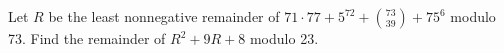 Let $R$ be the least nonnegative remainder of $71\cdot77+5^{72}+\binom{73}{39}+75^6$ modulo 73. Find the remainder of $R^2+9R+8$ modulo 23.
